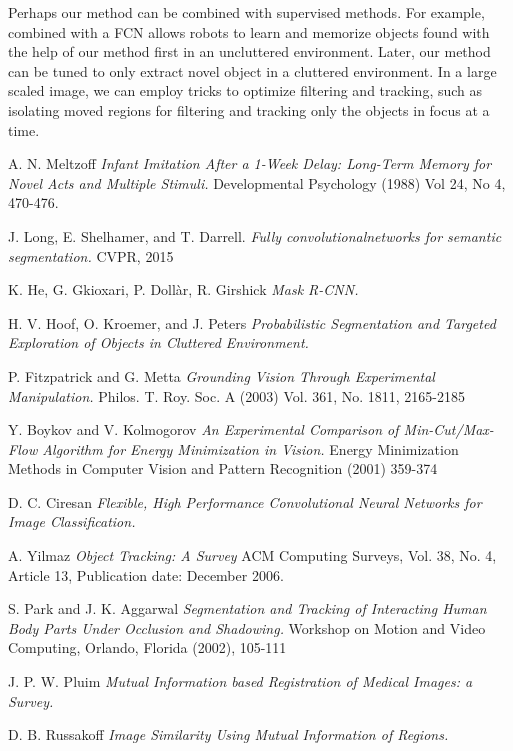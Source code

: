 \documentclass{article}
\begin{document}
Perhaps our method can be combined with supervised methods. For example, combined with a FCN allows robots to learn and memorize objects found with the help of our method first in an uncluttered environment. Later, our method can be tuned to only extract novel object in a cluttered environment. In a large scaled image, we can employ tricks to optimize filtering and tracking, such as isolating moved regions for filtering and tracking only the objects in focus at a time. 

\begin{thebibliography}{9}

	A. N. Meltzoff
	\emph{Infant Imitation After a 1-Week Delay: Long-Term Memory for Novel Acts and Multiple Stimuli.}
	Developmental Psychology (1988) Vol 24, No 4, 470-476.
	
	J. Long, E. Shelhamer, and T. Darrell. 
	\emph{Fully convolutionalnetworks for semantic segmentation.}
	CVPR, 2015

	K. He, G. Gkioxari, P. Doll\`ar, R. Girshick
	\emph{Mask R-CNN.}
	
  H. V. Hoof, O. Kroemer, and J. Peters
  \emph{Probabilistic Segmentation and Targeted Exploration of Objects in Cluttered Environment.}
  
	P. Fitzpatrick and G. Metta 
	\emph{Grounding Vision Through Experimental Manipulation.}
	Philos. T. Roy. Soc. A (2003) Vol. 361, No. 1811, 2165-2185
	
	Y. Boykov and V. Kolmogorov
	\emph{An Experimental Comparison of Min-Cut/Max-Flow Algorithm for Energy Minimization in Vision.}
	Energy Minimization Methods in Computer Vision and Pattern Recognition (2001) 359-374

	D. C. Ciresan
	\emph{Flexible, High Performance Convolutional Neural Networks for Image Classification.}
	
	A. Yilmaz
	\emph{Object Tracking: A Survey} ACM Computing Surveys, Vol. 38, No. 4, Article 13, Publication date: December 2006.

	S. Park and J. K. Aggarwal
	\emph{Segmentation and Tracking of Interacting Human Body Parts Under Occlusion and Shadowing.} Workshop on Motion and Video Computing, Orlando, Florida (2002), 105-111

	J. P. W. Pluim
	\emph{Mutual Information based Registration of Medical Images: a Survey.}
	
	D. B. Russakoff
	\emph{Image Similarity Using Mutual Information of Regions.}
	
\end{thebibliography}
\end{document}
